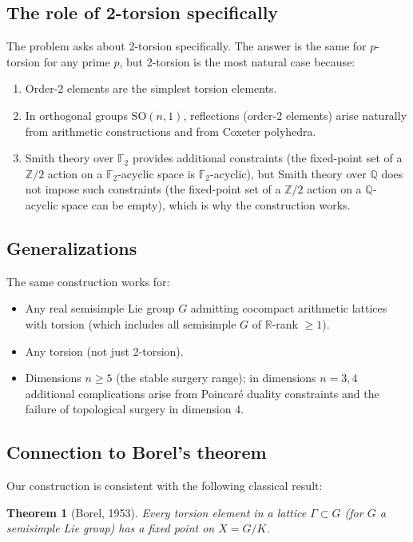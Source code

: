 \documentclass[12pt]{article}
\newtheorem{theorem}{Theorem}[section]
\newcommand{\R}{\mathbb{R}}
\newcommand{\Z}{\mathbb{Z}}
\newcommand{\Q}{\mathbb{Q}}
\newcommand{\SO}{\mathrm{SO}}
\begin{document}
\subsection{The role of 2-torsion specifically}

The problem asks about 2-torsion specifically.  The answer is the same for $p$-torsion for any
prime $p$, but 2-torsion is the most natural case because:
\begin{enumerate}
\item Order-2 elements are the simplest torsion elements.
\item In orthogonal groups $\SO(n,1)$, reflections (order-2 elements) arise naturally from
      arithmetic constructions and from Coxeter polyhedra.
\item Smith theory over $\mathbb{F}_2$ provides additional constraints (the fixed-point set of a
      $\Z/2$ action on a $\mathbb{F}_2$-acyclic space is $\mathbb{F}_2$-acyclic), but Smith theory
      over $\Q$ does not impose such constraints (the fixed-point set of a $\Z/2$ action on a
      $\Q$-acyclic space can be empty), which is why the construction works.
\end{enumerate}

\subsection{Generalizations}

The same construction works for:
\begin{itemize}
\item Any real semisimple Lie group $G$ admitting cocompact arithmetic lattices with torsion
      (which includes all semisimple $G$ of $\R$-rank $\geq 1$).
\item Any torsion (not just 2-torsion).
\item Dimensions $n \geq 5$ (the stable surgery range); in dimensions $n = 3, 4$ additional
      complications arise from Poincar\'e duality constraints and the failure of topological
      surgery in dimension $4$.
\end{itemize}

\subsection{Connection to Borel's theorem}

Our construction is consistent with the following classical result:

\begin{theorem}[Borel, 1953]\label{thm:borel}
Every torsion element in a lattice $\Gamma \subset G$ (for $G$ a semisimple Lie group) has a
fixed point on $X = G/K$.
\end{theorem}
\end{document}
